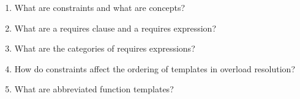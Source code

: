 \begin{enumerate}
\item
What are constraints and what are concepts?

\item
What are a requires clause and a requires expression?

\item
What are the categories of requires expressions?

\item
How do constraints affect the ordering of templates in overload resolution?

\item
What are abbreviated function templates?
\end{enumerate}